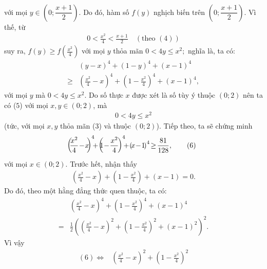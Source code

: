 \begin{multicols}{2}
\begin{align*}
	\end{align*}
	với mọi $y \in \left( {0;\dfrac{{x + 1}}{2}} \right).$
	\vskip 0.05cm
	Do đó, hàm số $f(y)$ nghịch biến trên   $\left( {0;\dfrac{{x + 1}}{2}} \right).$
	\vskip 0.05cm
	Vì thế, từ 
	\begin{align*}
		0 < \frac{{{x^2}}}{4} < \frac{{x + 1}}{2} \quad(\text{theo } (4))
	\end{align*}
	suy ra, $f\left( y \right) \ge f\left( {\frac{{{x^2}}}{4}} \right)$ với mọi $y$ thỏa mãn $0 < 4y \le {x^2};$ nghĩa là, ta có:
	\begin{align*}
		&{\left( {y - x} \right)^4} + {\left( {1 - y} \right)^4} + {\left( {x - 1} \right)^4} \\
		\ge &{\left(\! \!{\frac{{{x^2}}}{4} \!-\! x} \!\!\right)^4} \!+\! {\left(\!\! {1 \!-\! \frac{{{x^2}}}{4}}\!\! \right)^4} \!+\! {\left( {x \!-\! 1} \right)^4}, \tag{$5$}
	\end{align*}
	với mọi $y$ mà $0 < 4y \le {x^2}.$
	\vskip 0.05cm
	Do số thực $x$ được xét là số tùy ý thuộc $(0; 2)$ nên ta có ($5$) với mọi $x, y \in (0; 2)$, mà 
	\begin{align*}
		0 < 4y \le x^2
	\end{align*}
	(tức, với mọi $x, y$ thỏa mãn ($3$) và thuộc $(0; 2)$).
	\vskip 0.05cm
	Tiếp theo, ta sẽ chứng minh
	\begin{align*}
		\hspace*{-5pt}{\left(\!\! {\frac{{{x^2}}}{4} \!-\! x}\!\! \right)^4} \!\!\!+\! {\left(\!\!\! {1 \!-\! \frac{{{x^2}}}{4}}\! \right)^4}\!\! \!+\! {\left(\! {x \!-\! 1} \!\right)^4} \!\ge\! \frac{{81}}{{128}}, \tag{$6$}
	\end{align*}
	với mọi $x \in (0; 2)$.
	\vskip 0.05cm
	Trước hết, nhận thấy
	\begin{align*}
		\left( {\frac{{{x^2}}}{4} - x} \right) + \left( {1 - \frac{{{x^2}}}{4}} \right) + \left( {x - 1} \right) = 0.
	\end{align*}
	Do đó, theo một hằng đẳng thức quen thuộc, ta có:
	\begin{align*}
		&{\left( {\frac{{{x^2}}}{4} - x} \right)^4} + {\left( {1 - \frac{{{x^2}}}{4}} \right)^4} + {\left( {x - 1} \right)^4} \\
		= &\frac{1}{2}{\left(\!\! {{{\left(\!\! {\frac{{{x^2}}}{4} \!-\! x} \!\!\right)}^2} \!+\! {{\left(\!\! {1 \!-\! \frac{{{x^2}}}{4}} \!\!\right)}^2} \!+\! {{\left( {x - 1}\!\! \right)}^2}}\!\! \right)^2}.
	\end{align*}
	Vì vậy
	\begin{align*}
		(6) \Leftrightarrow &{\left( {\frac{{{x^2}}}{4} - x} \right)^2} + {\left( {1 - \frac{{{x^2}}}{4}} \right)^2} \\

\end{align*}
\end{multicols}
